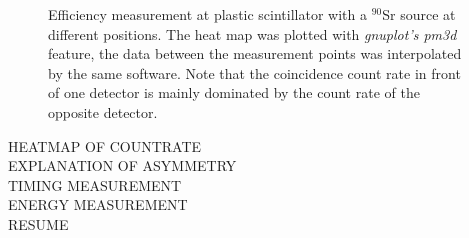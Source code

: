 \documentclass[12pt]{article}
\newcommand{\tit}[1]{\textit{#1}}
\newcommand{\sr}{$^{90}$Sr}
\begin{document}
\begin{figure}[b!]
	\hfill
	\hfill
	\hfill
	\hfill
	\caption[Efficiency measurement setup]{Efficiency measurement at plastic scintillator with a \sr{} source at different positions. The heat map was plotted with \tit{gnuplot's pm3d} feature, the data between the measurement points was interpolated by the same software. Note that the coincidence count rate in front of one detector is mainly dominated by the count rate of the opposite detector.}
	\label{fig:efficiency}
\end{figure} 




HEATMAP OF COUNTRATE \\
EXPLANATION OF ASYMMETRY \\
TIMING MEASUREMENT \\
ENERGY MEASUREMENT \\
RESUME 







\end{document}
